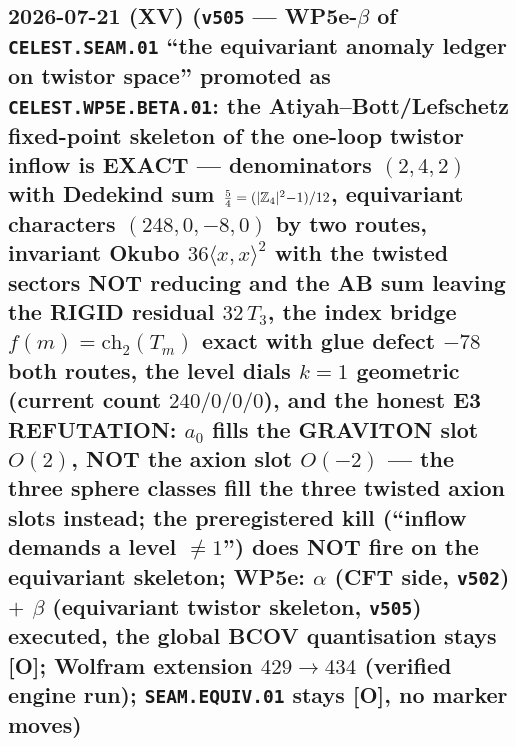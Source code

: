 \documentclass[11pt]{article}
\providecommand{\mO}{\textbf{[O]}}\providecommand{\mX}{\textbf{[X]}}
\begin{document}
\subsection*{2026-07-21 (XV) (\texttt{v505} --- WP5e-$\beta$ of \texttt{CELEST.SEAM.01} ``the equivariant anomaly ledger on twistor space'' promoted as \texttt{CELEST.WP5E.BETA.01}: the Atiyah--Bott/Lefschetz fixed-point skeleton of the one-loop twistor inflow is EXACT --- denominators $(2,4,2)$ with Dedekind sum $\tfrac54=(|\mathbb{Z}_4|^2{-}1)/12$, equivariant characters $(248,0,-8,0)$ by two routes, invariant Okubo $36\langle x,x\rangle^2$ with the twisted sectors NOT reducing and the AB sum leaving the RIGID residual $32\,T_3$, the index bridge $f(m)=\mathrm{ch}_2(T_m)$ exact with glue defect $-78$ both routes, the level dials $k=1$ geometric (current count $240/0/0/0$), and the honest E3 REFUTATION: $a_0$ fills the GRAVITON slot $O(2)$, NOT the axion slot $O(-2)$ --- the three sphere classes fill the three twisted axion slots instead; the preregistered kill (``inflow demands a level $\neq1$'') does NOT fire on the equivariant skeleton; WP5e: $\alpha$ (CFT side, \texttt{v502}) $+$ $\beta$ (equivariant twistor skeleton, \texttt{v505}) executed, the global BCOV quantisation stays \mO; Wolfram extension $429\to434$ (verified engine run); \texttt{SEAM.EQUIV.01} stays \mO, no marker moves)}
\end{document}
